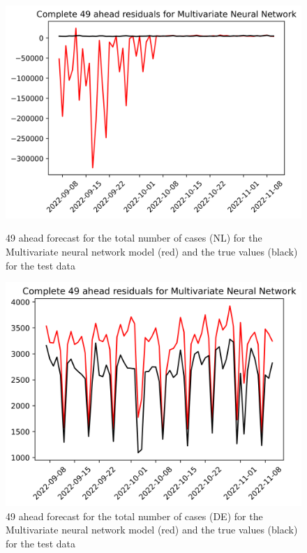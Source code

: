 \begin{figure}

\begin{minipage}{.45\textwidth}
  \centering
  \includegraphics[width=\linewidth]{pics/49_ah/Complete_49_ahead_Multivariate Neural Network.png}
  \caption{49 ahead forecast for the total number of cases (NL) for the Multivariate neural network model (red) and the true values (black) for the test data}
  \label{fig:tot_cases_fc_49_mvnn}
\end{minipage}
\begin{minipage}{.45\textwidth}
  \centering
  \includegraphics[width=\linewidth]{pics/49_ah/DE_Complete_49_ahead_Multivariate Neural Network.png}
  \caption{49 ahead forecast for the total number of cases (DE) for the Multivariate neural network model (red) and the true values (black) for the test data}
  \label{fig:tot_cases_fc_49_mvnn_DE}
\end{minipage}

\end{figure}
